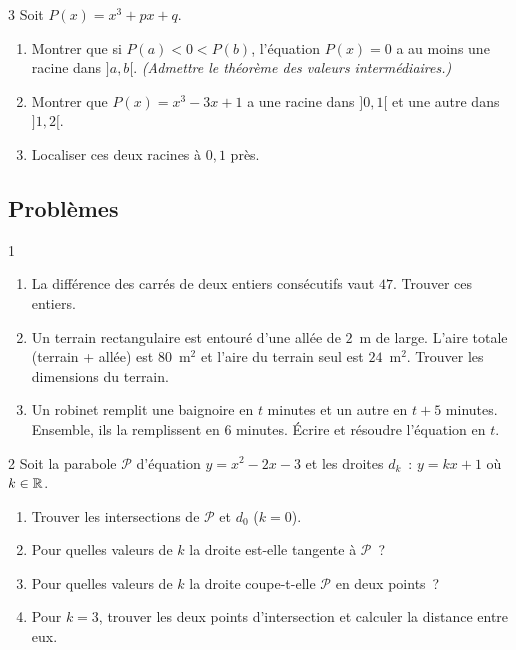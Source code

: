 \begin{exo}{3}
Soit $P(x) = x^3 + px + q$.
\begin{enumerate}
  \item Montrer que si $P(a) < 0 < P(b)$, l'\'equation $P(x)=0$ a au moins
        une racine dans $]a,b[$. \emph{(Admettre le th\'eor\`eme des valeurs interm\'ediaires.)}
  \item Montrer que $P(x) = x^3 - 3x + 1$ a une racine dans $]0,1[$
        et une autre dans $]1,2[$.
  \item Localiser ces deux racines \`a $0{,}1$ pr\`es.
\end{enumerate}
\end{exo}

\subsection*{Probl\`emes}

\begin{probleme}{1}
\begin{enumerate}
  \item La diff\'erence des carr\'es de deux entiers cons\'ecutifs vaut $47$.
        Trouver ces entiers.
  \item Un terrain rectangulaire est entour\'e d'une all\'ee de $2$~m de large.
        L'aire totale (terrain + all\'ee) est $80$~m$^2$ et l'aire du terrain seul
        est $24$~m$^2$. Trouver les dimensions du terrain.
  \item Un robinet remplit une baignoire en $t$ minutes et un autre
        en $t+5$ minutes. Ensemble, ils la remplissent en $6$ minutes.
        \'Ecrire et r\'esoudre l'\'equation en $t$.
\end{enumerate}
\end{probleme}

\begin{probleme}{2}
Soit la parabole $\mathcal{P}$ d'\'equation $y = x^2 - 2x - 3$
et les droites $d_k$~: $y = kx + 1$ o\`u $k \in \mathbb{R}$.
\begin{enumerate}
  \item Trouver les intersections de $\mathcal{P}$ et $d_0$ ($k=0$).
  \item Pour quelles valeurs de $k$ la droite est-elle tangente \`a $\mathcal{P}$~?
  \item Pour quelles valeurs de $k$ la droite coupe-t-elle $\mathcal{P}$ en deux points~?
  \item Pour $k=3$, trouver les deux points d'intersection et calculer la distance
        entre eux.
\end{enumerate}
\end{probleme}

